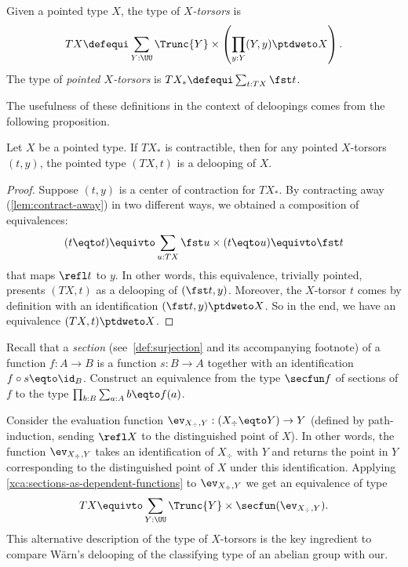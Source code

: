 \begin{definition}[W\"{a}rn]
  Given a pointed type $X$, the type of {\em $X$-torsors} is
  \begin{displaymath}
    TX \defequi \sum_{Y : \UU} \Trunc{Y} \times \left( \prod_{y:Y}(Y,y) \ptdweto X \right).
  \end{displaymath}
  The type of {\em pointed $X$-torsors} is
  $TX_\ast \defequi \sum_{t : TX}\fst t$.
\end{definition}
The usefulness of these definitions in the context of deloopings comes
from the following proposition.
\begin{lemma}[W\"{a}rn]
  Let $X$ be a pointed type. If $TX_\ast$ is contractible, then for
  any pointed $X$-torsors $(t,y)$, the pointed type $(TX,t)$ is a
  delooping of $X$.
\end{lemma}
\begin{proof}
  Suppose $(t,y)$ is a center of contraction for $TX_\ast$. By
  contracting away (\cref{lem:contract-away}) in two different ways,
  we obtained a composition of equivalences:
  \begin{displaymath}
    (t \eqto t) \equivto \sum_{u : TX}\fst u \times (t \eqto u) \equivto \fst t 
  \end{displaymath}
  that maps $\refl t$ to $y$. In other words, this equivalence,
  trivially pointed, presents $(TX, t)$ as a delooping of
  $(\fst t, y)$. Moreover, the $X$-torsor $t$ comes by definition with
  an identification $(\fst t,y) \ptdweto X$. So in the end, we have an
  equivalence $(TX, t) \ptdweto X$.
\end{proof}

\begin{xca}\label{xca:sections-as-dependent-functions}
  Recall that a \emph{section} (see~\cref{def:surjection} and its
  accompanying footnote) of a function $f:A \to B$ is a function
  $s: B \to A$ together with an identification $f\circ s \eqto \id_B$.
  Construct an equivalence from the type $\secfun f$ of sections of
  $f$ to the type $\prod_{b:B}\sum_{a:A}b \eqto f(a)$.
\end{xca}

Consider the evaluation function
$\ev_{X_\div,Y} : (X_\div \eqto Y) \to Y$ (defined by path-induction,
sending $\refl X$ to the distinguished point of $X$). In other words,
the function $\ev_{X_\div,Y}$ takes an identification of $X_\div$ with
$Y$ and returns the point in $Y$ corresponding to the distinguished
point of $X$ under this identification.  Applying
\cref{xca:sections-as-dependent-functions} to $\ev_{X_\div,Y}$ we get
an equivalence of type
\begin{displaymath}
  TX \equivto \sum_{Y : \UU} \Trunc{Y} \times \secfun(\ev_{X_\div,Y}).
\end{displaymath}
This alternative description of the type of $X$-torsors is the key
ingredient to compare W\"arn's delooping of the classifying type of
an abelian group with our.

